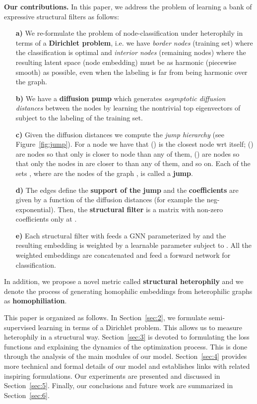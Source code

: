 \documentclass{article}
\theoremstyle{plain}
\theoremstyle{definition}
\begin{document}
\textbf{Our contributions.} In this paper, we address the problem of learning a bank of expressive structural filters as follows:
\begin{enumerate}
    \item[\textbf{a)}] We re-formulate the problem of node-classification under heterophily in terms of a \textbf{Dirichlet problem}, i.e. we have \emph{border nodes} (training set) where the classification is optimal and \emph{interior nodes} (remaining nodes) where the resulting latent space (node embedding) must be as harmonic (piecewise smooth) as possible, even when the labeling is far from being harmonic over the graph. 
\item[\textbf{b)}] We have a \textbf{diffusion pump} which generates \emph{asymptotic diffusion distances}  between the nodes by learning the nontrivial top eigenvectors of  subject to the labeling of the training set. 
\item[\textbf{c)}] Given the diffusion distances  we compute the \emph{jump hierarchy} (see Figure~\ref{fig:jump}). For a node  we have that  () is the closest node wrt itself;  () are nodes so that only  is closer to node  than any of them,  () are nodes so that only the nodes in  are closer to  than any of them, and so on. Each of the sets , where  are the nodes of the graph , is called a \textbf{jump}. 
\item[\textbf{d)}] The edges  define the \textbf{support of the jump} and the \textbf{coefficients}  are given by a function  of the diffusion distances (for example the neg-exponential). Then, the \textbf{structural filter}  is a matrix with non-zero coefficients only at . 
\item[\textbf{e)}] Each structural filter  with  feeds a GNN parameterized by  and the resulting embedding   is weighted by a learnable parameter  subject to  . All the weighted embeddings are concatenated and feed a forward network for classification. 
\end{enumerate}

In addition, we propose a novel metric called \textbf{structural heterophily} and we denote the process of generating homophilic embeddings from heterophilic graphs as \textbf{homophiliation}.

This paper is organized as follows. In Section~\ref{sec:2}, we formulate semi-supervised learning in terms of a Dirichlet problem. This allows us to measure heterophily in a structural way. Section~\ref{sec:3} is devoted to formulating the loss functions and explaining the dynamics of the optimization process. This is done through the analysis of the main modules of our model. Section~\ref{sec:4} provides more technical and formal details of our model and establishes links with related inspiring formulations. Our experiments are presented and discussed in Section~\ref{sec:5}. Finally, our conclusions and future work are summarized in Section~\ref{sec:6}.
\end{document}
